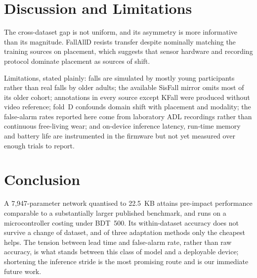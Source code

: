 \documentclass[conference]{IEEEtran}
\begin{document}
\section{Discussion and Limitations}

The cross-dataset gap is not uniform, and its asymmetry is more informative than its
magnitude. FallAllD resists transfer despite nominally matching the training sources
on placement, which suggests that sensor hardware and recording protocol dominate
placement as sources of shift.

Limitations, stated plainly: falls are simulated by mostly young participants rather
than real falls by older adults; the available SisFall mirror omits most of its older
cohort; annotations in every source except KFall were produced without video
reference; fold~D confounds domain shift with placement and modality; the false-alarm
rates reported here come from laboratory ADL recordings rather than continuous
free-living wear; and on-device inference latency, run-time memory and battery life
are instrumented in the firmware but not yet measured over enough trials to report.

\section{Conclusion}

A 7{,}947-parameter network quantised to 22.5~KB attains pre-impact performance
comparable to a substantially larger published benchmark, and runs on a
microcontroller costing under BDT~500. Its within-dataset accuracy does not survive a
change of dataset, and of three adaptation methods only the cheapest helps. The
tension between lead time and false-alarm rate, rather than raw accuracy, is what
stands between this class of model and a deployable device; shortening the inference
stride is the most promising route and is our immediate future work.



\end{document}
